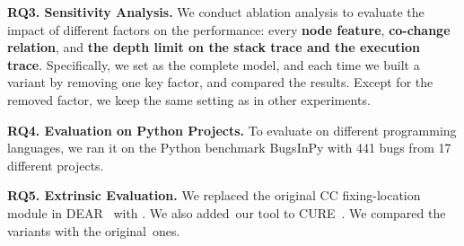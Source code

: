 {\bf RQ3. Sensitivity Analysis.}  We conduct ablation
analysis to evaluate the impact of different factors on the
performance: every {\bf node feature}, {\bf co-change
relation}, and {\bf the depth limit on the stack trace and the
execution trace}. Specifically, we set {\tool} as the complete model,
and each time we built a variant by removing one key factor,
and compared the results.
Except for the removed factor, we keep the same setting
as in other experiments.

{\bf RQ4. Evaluation on Python Projects.}
%
To evaluate {\tool} on different programming languages, we ran it on the Python benchmark BugsInPy \cite{BugsInPy,widyasari2020bugsinpy} with 441 bugs from 17 different projects.



{\bf RQ5. Extrinsic Evaluation.}
We replaced the original CC fixing-location module in
DEAR~\cite{icse22} with {\tool}. We also added~our tool to
CURE~\cite{cure-icse21}. We compared the variants with the
original~ones.


